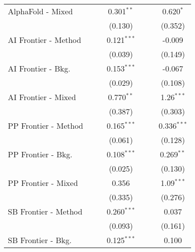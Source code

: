 \begin{tabular}{lcccccc}
   AlphaFold - Mixed    &               &               & 0.301$^{**}$  &               &               & 0.620$^{*}$\\   
                        &               &               & (0.130)       &               &               & (0.352)\\   
   AI Frontier - Method &               &               & 0.121$^{***}$ &               &               & -0.009\\   
                        &               &               & (0.039)       &               &               & (0.149)\\   
   AI Frontier - Bkg.   &               &               & 0.153$^{***}$ &               &               & -0.067\\   
                        &               &               & (0.029)       &               &               & (0.108)\\   
   AI Frontier - Mixed  &               &               & 0.770$^{**}$  &               &               & 1.26$^{***}$\\   
                        &               &               & (0.387)       &               &               & (0.303)\\   
   PP Frontier - Method &               &               & 0.165$^{***}$ &               &               & 0.336$^{***}$\\   
                        &               &               & (0.061)       &               &               & (0.128)\\   
   PP Frontier - Bkg.   &               &               & 0.108$^{***}$ &               &               & 0.269$^{**}$\\   
                        &               &               & (0.025)       &               &               & (0.130)\\   
   PP Frontier - Mixed  &               &               & 0.356         &               &               & 1.09$^{***}$\\   
                        &               &               & (0.335)       &               &               & (0.276)\\   
   SB Frontier - Method &               &               & 0.260$^{***}$ &               &               & 0.037\\   
                        &               &               & (0.093)       &               &               & (0.161)\\   
   SB Frontier - Bkg.   &               &               & 0.125$^{***}$ &               &               & 0.100\\   

\end{tabular}
